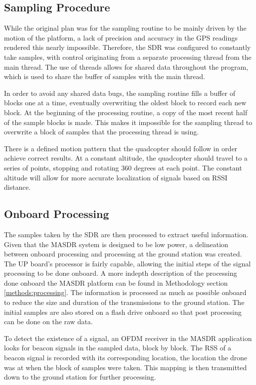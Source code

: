 \subsection{Sampling Procedure} \label{impl:rotate}
While the original plan was for the sampling routine to be mainly driven by the motion of the platform, a lack of precision and accuracy in the GPS readings rendered this nearly impossible. Therefore, the SDR was configured to constantly take samples, with control originating from a separate processing thread from the main thread. The use of threads allows for shared data throughout the program, which is used to share the  buffer of samples with the main thread. \par
In order to avoid any shared data bugs, the sampling routine fills a buffer of blocks one at a time, eventually overwriting the oldest block to record each new block. At the beginning of the processing routine, a copy of the most recent half of the sample blocks is made. This makes it impossible for the sampling thread to overwrite a block of samples that the processing thread is using. \par
There is a defined motion pattern that the quadcopter should follow in order achieve correct results. At a constant altitude, the quadcopter should travel to a series of points, stopping and rotating 360 degrees at each point. The constant altitude will allow for more accurate localization of signals based on RSSI distance.
\subsection{Onboard Processing}
The samples taken by the SDR are then processed to extract useful information. Given that the MASDR system is designed to be low power, a delineation between onboard processing and processing at the ground station was created. The UP board’s processor is fairly capable, allowing the initial steps of the signal processing to be done onboard. A more indepth description of the processing done onboard the MASDR platform can be found in Methodology section \ref{methods:processing}. The information is processed as much as possible onboard to reduce the size and duration of the transmissions to the ground station. The initial samples are also stored on a flash drive onboard so that post processing can be done on the raw data. \par
To detect the existence of a signal, an OFDM receiver in the MASDR application looks for beacon signals in the sampled data, block by block. The RSS of a beacon signal is recorded with its corresponding location, the location the drone was at when the block of samples were taken. This mapping is then transmitted down to the ground station for further processing.
